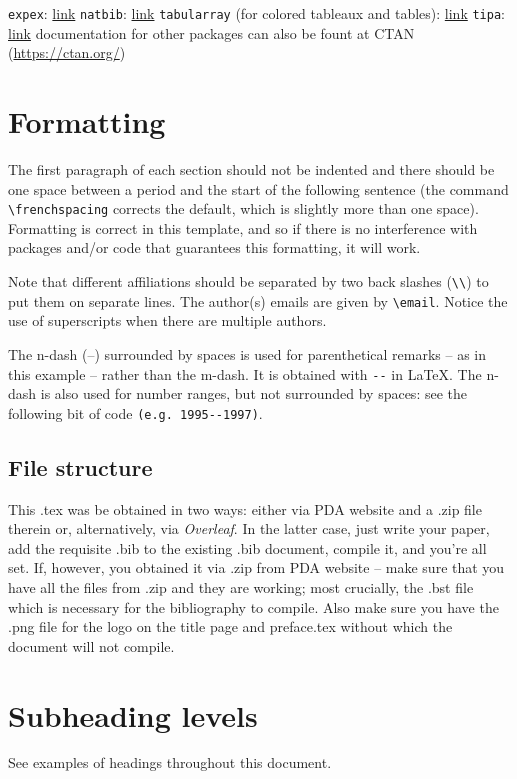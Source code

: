 \documentclass[11pt, letterpaper]{article}
\newcommand{\email}[1] {\href{mailto:#1}{#1}}
\begin{document}
\pex
\a \verb=expex=: \href{https://ctan.org/pkg/expex?lang=en}{link}
\a \verb=natbib=: \href{https://ctan.org/pkg/natbib?lang=en}{link}
\a \verb=tabularray= (for colored tableaux and tables): \href{https://ctan.org/pkg/tabularray}{link}
\a \verb=tipa=: \href{https://ctan.org/pkg/tipa?lang=en}{link}
\a documentation for other packages can also be fount at CTAN (\href{https://ctan.org/}{https://ctan.org/})
\xe

\section{Formatting}
The first paragraph of each section should not be indented and there should be one space between a period and the start of the following sentence (the command \verb=\frenchspacing= corrects the default, which is slightly more than one space). Formatting is correct in this template, and so if there is no interference with packages and/or code that guarantees this formatting, it will work.

Note that different affiliations should be separated by two back slashes (\verb=\\=) to put them on separate lines. The author(s) emails are given by \verb=\email=. Notice the use of superscripts when there are multiple authors.

The n-dash (--) surrounded by spaces is used for parenthetical remarks -- as in this example -- rather than the m-dash. It is obtained with \verb=--= in LaTeX. The n-dash is also used for number ranges, but not surrounded by spaces: see the following bit of code \verb=(e.g. 1995--1997)=.

\subsection{File structure}
This .tex was be obtained in two ways: either via PDA website and a .zip file therein or, alternatively, via \textit{Overleaf}. In the latter case, just write your paper, add the requisite .bib to the existing .bib document, compile it, and you're all set. If, however, you obtained it via .zip from PDA website -- make sure that you have all the files from .zip and they are working; most crucially, the .bst file which is necessary for the bibliography to compile. Also make sure you have the .png file for the logo on the title page and preface.tex without which the document will not compile.

\section{Subheading levels}
See examples of headings throughout this document.
\end{document}
